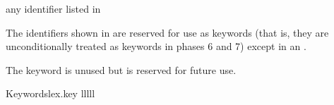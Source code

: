 \begin{bnf}
\br
    \textnormal{any identifier listed in }\br
    \br
    \br
\end{bnf}

\pnum
{}%
The identifiers shown in  are reserved for use
as keywords (that is, they are unconditionally treated as keywords in
phases 6 and 7) except in an .
\begin{note}
The  keyword is unused but
is reserved for future use.
\end{note}

\begin{multicolfloattable}{Keywords}{lex.key}
{lllll}
 \\
 \\
 \\
 \\
 \\
 \\
 \\
 \\
 \\
 \\
 \\
 \\
 \\
 \\
 \\
 \\
 \\
\columnbreak
{} \\
 \\
 \\
 \\
 \\
 \\
 \\
 \\
 \\
 \\
 \\
 \\

\end{multicolfloattable}
